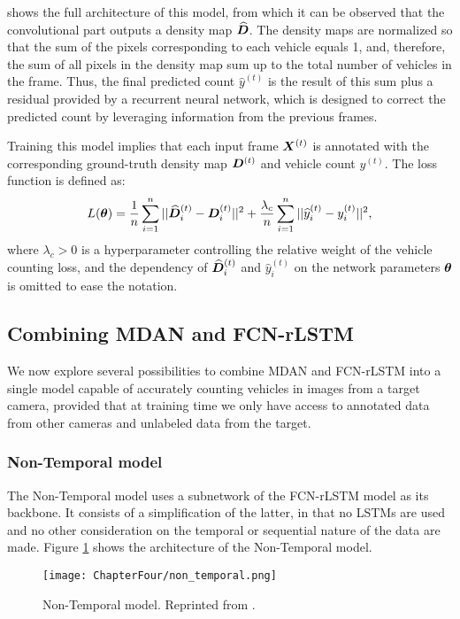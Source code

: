  shows the full architecture of this model, from which it can be observed that the convolutional part outputs a density map $\widehat{{\bm{D}}}$. The density maps are normalized so that the sum of the pixels corresponding to each vehicle equals 1, and, therefore, the sum of all pixels in the density map sum up to the total number of vehicles in the frame. Thus, the final predicted count $\widehat{y}^{(t)}$ is the result of this sum plus a residual provided by a recurrent neural network, which is designed to correct the predicted count by leveraging information from the previous frames.

Training this model implies that each input frame ${\bm{X}}^{(t)}$ is annotated with the corresponding ground-truth density map ${\bm{D}}^{(t)}$ and vehicle count $y^{(t)}$. The loss function is defined as:
\begin{equation}
    L({\bm{\theta}}) = \frac{1}{n} \sum_{i=1}^{n} ||\widehat{{\bm{D}}}^{(t)}_i - {\bm{D}}^{(t)}_i||^2 + \frac{\lambda_c}{n} \sum_{i=1}^{n} ||\widehat{y}^{(t)}_i - y^{(t)}_i||^2,
\end{equation}
where $\lambda_c > 0$ is a hyperparameter controlling the relative weight of the vehicle counting loss, and the dependency of $\widehat{{\bm{D}}}^{(t)}_i$ and $\hat{y}^{(t)}_i$ on the network parameters ${\bm{\theta}}$ is omitted to ease the notation.

\subsection{Combining MDAN and FCN-rLSTM}
\label{sec:mdan_fcn_rlstm}
We now explore several possibilities to combine MDAN and FCN-rLSTM into a single model capable of accurately counting vehicles in images from a target camera, provided that at training time we only have access to annotated data from other cameras and unlabeled data from the target.

\subsubsection{Non-Temporal model}
The Non-Temporal model uses a subnetwork of the FCN-rLSTM model as its backbone. It consists of a simplification of the latter, in that no LSTMs are used and no other consideration on the temporal or sequential nature of the data are made. Figure \ref{fig:non_temporal_model} shows the architecture of the Non-Temporal model.

\begin{figure}[!ht]
    \centering
    \texttt{[image: ChapterFour/non\_temporal.png]}
    \caption{Non-Temporal model. Reprinted from \citet{ThesisFrancisco}.}
    \label{fig:non_temporal_model}
\end{figure}

